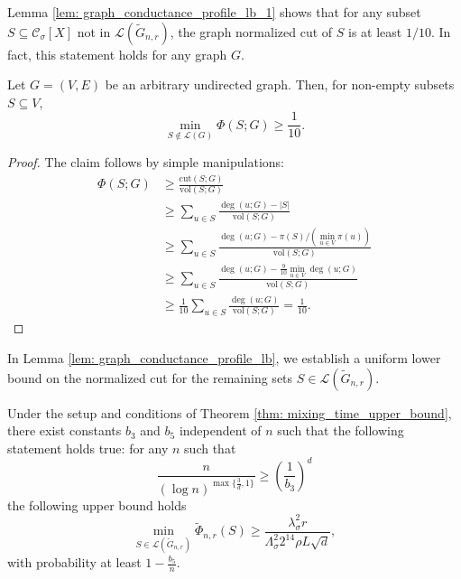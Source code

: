 \documentclass[11pt,twoside]{article}
\newcommand{\vol}{\mathrm{vol}}
\newcommand{\cut}{\mathrm{cut}}
\newcommand{\abs}[1]{\left \lvert #1 \right \rvert}
\newcommand{\1}{\mathbbm{1}}
\newcommand{\Xbf}{X}
\newcommand{\Cset}{\mathcal{C}}
\newcommand{\Csig}{\Cset_{\sigma}}
\begin{document}
Lemma \ref{lem: graph_conductance_profile_lb_1} shows that for any subset $S \subseteq \Csig[\Xbf]$ not in $\mathcal{L}(\widetilde{G}_{n,r})$, the graph normalized cut of $S$ is at least $1/10$. In fact, this statement holds for any graph $G$.
\begin{lemma}
	\label{lem: graph_conductance_profile_lb_1}
	Let $G = (V,E)$ be an arbitrary undirected graph. Then, for non-empty subsets $S \subseteq V$, 
	\begin{equation*}
	\min_{S \not\in \mathcal{L}(G)}\Phi(S; G) \geq \frac{1}{10}.
	\end{equation*}
\end{lemma}
\begin{proof}
	The claim follows by simple manipulations:
	\begin{align*}
	\Phi(S;G) & \geq \frac{\cut(S;G)}{\vol(S;G)} \\
	& \geq \sum_{u \in S} \frac{\deg(u;G) - \abs{S}}{\vol(S;G)} \\
	& \geq \sum_{u \in S} \frac{\deg(u;G) - \pi(S)/(\min_{u \in V}\pi(u))}{\vol(S;G)} \\
	& \geq \sum_{u \in S} \frac{\deg(u;G) - \frac{9}{10} \min_{u \in V}\deg(u;G)}{\vol(S;G)} \\
	& \geq \frac{1}{10} \sum_{u \in S} \frac{\deg(u;G)}{\vol(S;G)} = \frac{1}{10}.
	\end{align*}
\end{proof}

In Lemma \ref{lem: graph_conductance_profile_lb}, we establish a uniform lower bound on the normalized cut for the remaining sets $S \in \mathcal{L}(\widetilde{G}_{n,r})$. 

\begin{lemma}
	\label{lem: graph_conductance_profile_lb}
	Under the setup and conditions of Theorem \ref{thm: mixing_time_upper_bound}, there exist constants $b_3$ and $b_5$ independent of $n$ such that the following statement holds true: for any $n$ such that
	\begin{equation*}
	\frac{n}{(\log n)^{\max\{\frac{3}{d},1\}}} \geq \left(\frac{1}{b_3}\right)^d
	\end{equation*}
	the following upper bound holds
	\begin{equation}
	\label{eqn: graph_conductance_profile_lb}
	\min_{S \in \mathcal{L}(\widetilde{G}_{n,r})} \widetilde{\Phi}_{n,r}(S) \geq \frac{\lambda_{\sigma}^2 r}{\Lambda_{\sigma}^2 2^{14} \rho L \sqrt{d}},
	\end{equation}
	with probability at least $1 - \frac{b_5}{n}$. 
\end{lemma}
\end{document}
